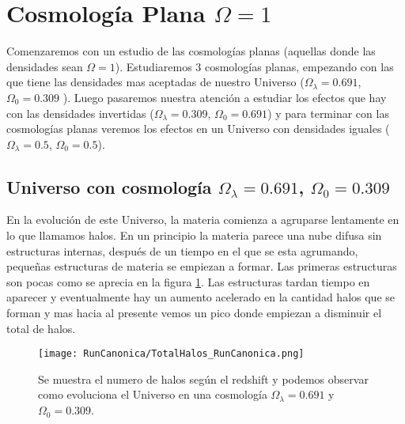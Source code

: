 \section[Cosmología Plana \texorpdfstring{$\Omega = 1$}{Omega = 1}]{Cosmología Plana \texorpdfstring{$\Omega = 1$}{Omega = 1}}

\noindent Comenzaremos con un estudio de las cosmologías planas (aquellas donde las densidades sean $\Omega = 1$). Estudiaremos 3 cosmologías planas, empezando con las que tiene las densidades mas aceptadas de nuestro Universo ($\Omega_\lambda = 0.691$, $\Omega_0 = 0.309$  \cite{2020A&A...641A...1P}). Luego pasaremos nuestra atención a estudiar los efectos que hay con las densidades invertidas ($\Omega_\lambda = 0.309$, $\Omega_0 = 0.691$) y para terminar con las cosmologías planas veremos los efectos en un Universo con densidades iguales ($\Omega_\lambda = 0.5$, $\Omega_0 = 0.5$).

\subsection{Universo con cosmología  \texorpdfstring{$\Omega_\lambda = 0.691$, $\Omega_0 = 0.309$ }{Omega lambda = 0.691, Omega 0 = 0.309}  }

 En la evolución de este Universo, la materia comienza a agruparse lentamente en lo que llamamos halos. En un principio la materia parece una nube difusa sin estructuras internas, después de un tiempo en el que se esta agrumando, pequeñas estructuras de materia se empiezan a formar. Las primeras estructuras son pocas como se aprecia en la figura \ref{fig:Canon_TotalHalos}. Las estructuras tardan tiempo en aparecer y eventualmente hay un aumento acelerado en la cantidad halos que se forman y mas hacia al presente vemos un pico donde empiezan a disminuir el total de halos.

\begin{figure}[H]
    \centering
    \texttt{[image: RunCanonica/TotalHalos\_RunCanonica.png]}
    \caption[Evolución del número de halos en un Universo $\Omega_\lambda = 0.691 $, $\Omega_0 = 0.309$]{\footnotesize Se muestra el numero de halos según el redshift y podemos observar como evoluciona el Universo en una cosmología $\Omega_\lambda = 0.691 $ y $\Omega_0 = 0.309$.}
    \label{fig:Canon_TotalHalos}
\end{figure}


